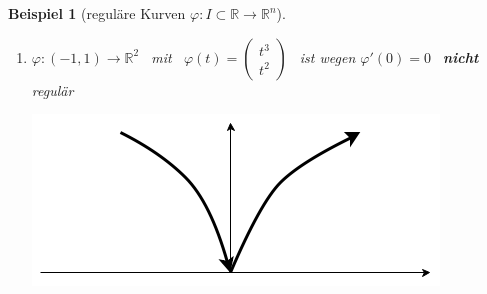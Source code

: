\documentclass[a4paper,12pt,portrait]{book}
\theoremstyle{theoremstyle}
\newtheorem{beispiel}[theo]{Beispiel}
\begin{document}
\begin{beispiel}[reguläre Kurven $\varphi:I\subset\mathbb{R}\rightarrow\mathbb{R}^n$]
\begin{enumerate}
$\varphi(\pm\frac{2\pi}{3})=\begin{pmatrix}
0 \\ 0
\end{pmatrix}, \ \varphi(0)=\begin{pmatrix}
3 \\ 0
\end{pmatrix}$\\
$\begin{pmatrix}
1 \\ 0
\end{pmatrix}$ \ gehört \textbf{nicht} zur Kurve ("$=\varphi(\pm\pi)$") und $\varphi$ ist regulär.

\item $\varphi:(-1,1)\rightarrow\mathbb{R}^2$ \ mit \ $\varphi(t)=\begin{pmatrix}
    t^3 \\ t^2
\end{pmatrix}$ \ ist wegen $\varphi'(0)=0$ \ \textbf{nicht} regulär\\

    \begin{center}
    \includegraphics[scale=0.3]{pictures/MA2_0004}
    \end{center}

\end{enumerate}

\end{beispiel}
\ \linebreak
\end{document}
